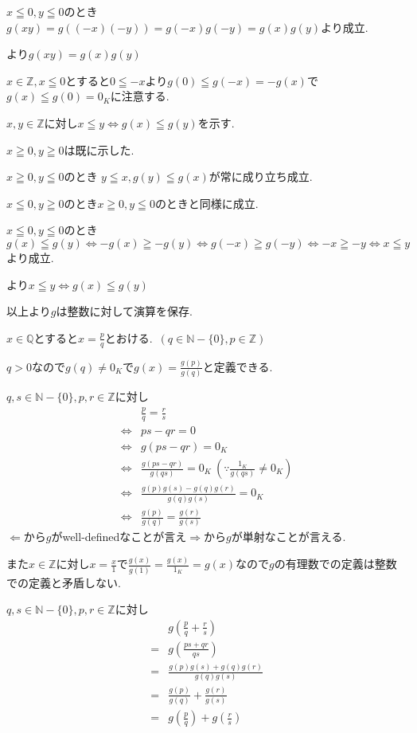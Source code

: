 \documentclass{jsarticle}
\begin{document}
$x\leqq 0,y\leqq 0$のとき$g(xy) = g((-x)(-y))=g(-x)g(-y)=g(x)g(y)$より成立.

より$g(xy)=g(x)g(y)$

$x\in \mathbb{Z},x \leqq 0$とすると$0 \leqq -x$より$g(0)\leqq g(-x)=-g(x)$で$g(x)\leqq g(0)=0_K$に注意する.

$x,y\in\mathbb{Z}$に対し$x\leqq y\Leftrightarrow g(x)\leqq g(y)$を示す.

$x\geqq 0,y\geqq 0$は既に示した.

$x\geqq 0,y\leqq 0$のとき
$y\leqq x,g(y)\leqq g(x)$が常に成り立ち成立.

$x\leqq 0,y\geqq 0$のとき$x\geqq 0,y\leqq 0$のときと同様に成立.

$x\leqq 0,y\leqq 0$のとき
\[g(x)\leqq g(y)\Leftrightarrow -g(x)\geqq -g(y) \Leftrightarrow g(-x)\geqq g(-y) \Leftrightarrow -x \geqq -y \Leftrightarrow x\leqq y\]
より成立.

より$x\leqq y\Leftrightarrow g(x)\leqq g(y)$

以上より$g$は整数に対して演算を保存.

$x\in \mathbb{Q}$とすると$x=\frac{p}{q}$とおける.\ $(q\in \mathbb{N}-\{0\},p\in\mathbb{Z})$

$q>0$なので$g(q)\neq 0_K$で$g(x) = \frac{g(p)}{g(q)}$と定義できる.

$q,s\in \mathbb{N}-\{0\},p,r\in\mathbb{Z}$に対し
\begin{align*}
&\frac{p}{q}=\frac{r}{s}\\
\Leftrightarrow & ps-qr=0\\
\Leftrightarrow & g(ps-qr)=0_K\\
\Leftrightarrow & \frac{g(ps-qr)}{g(qs)}=0_K \ (\because \frac{1_K}{g(qs)}\neq 0_K)\\
\Leftrightarrow & \frac{g(p)g(s)-g(q)g(r)}{g(q)g(s)}=0_K\\
\Leftrightarrow & \frac{g(p)}{g(q)}=\frac{g(r)}{g(s)}
\end{align*}
$\Leftarrow$から$g$がwell-definedなことが言え$\Rightarrow$から$g$が単射なことが言える.

また$x\in\mathbb{Z}$に対し$x=\frac{x}{1}$で$\frac{g(x)}{g(1)}=\frac{g(x)}{1_K}=g(x)$なので$g$の有理数での定義は整数での定義と矛盾しない.

$q,s\in \mathbb{N}-\{0\},p,r\in\mathbb{Z}$に対し
\begin{align*}
&g(\frac{p}{q}+\frac{r}{s})\\
= & g(\frac{ps+qr}{qs})\\
= & \frac{g(p)g(s)+g(q)g(r)}{g(q)g(s)}\\
= & \frac{g(p)}{g(q)}+\frac{g(r)}{g(s)}\\
= & g(\frac{p}{q})+g(\frac{r}{s})
\end{align*}
\end{document}

